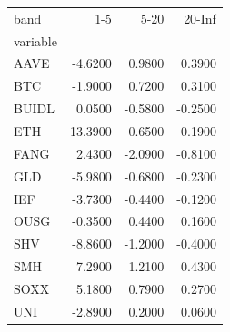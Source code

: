 \begin{tabular}{lrrr}
\toprule
band & 1-5 & 5-20 & 20-Inf \\
variable &  &  &  \\
\midrule
AAVE & -4.6200 & 0.9800 & 0.3900 \\
BTC & -1.9000 & 0.7200 & 0.3100 \\
BUIDL & 0.0500 & -0.5800 & -0.2500 \\
ETH & 13.3900 & 0.6500 & 0.1900 \\
FANG & 2.4300 & -2.0900 & -0.8100 \\
GLD & -5.9800 & -0.6800 & -0.2300 \\
IEF & -3.7300 & -0.4400 & -0.1200 \\
OUSG & -0.3500 & 0.4400 & 0.1600 \\
SHV & -8.8600 & -1.2000 & -0.4000 \\
SMH & 7.2900 & 1.2100 & 0.4300 \\
SOXX & 5.1800 & 0.7900 & 0.2700 \\
UNI & -2.8900 & 0.2000 & 0.0600 \\
\bottomrule
\end{tabular}
